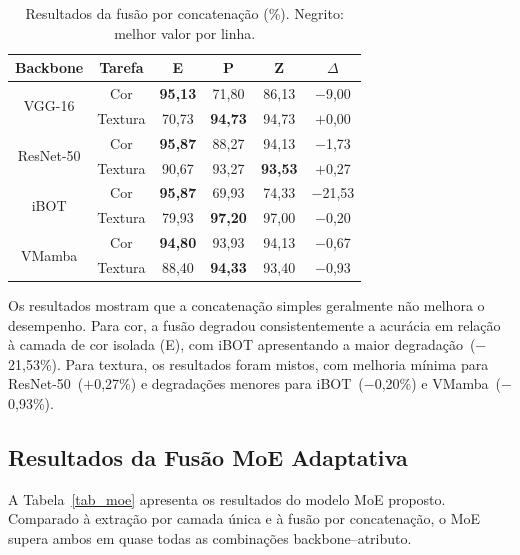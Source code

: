 \documentclass[conference]{IEEEtran}
\begin{document}
\begin{table}[htbp]
\caption{Resultados da fus\~{a}o por concatena\c{c}\~{a}o (\%). Negrito:
         melhor valor por linha.}
\begin{center}
\begin{tabular}{c|c|c|c|c|c}
\hline
\textbf{Backbone} & \textbf{Tarefa} & \textbf{E} & \textbf{P}
                  & \textbf{Z} & \textbf{$\Delta$} \\
\hline
\multirow{2}{*}{VGG-16}
  & Cor     & \textbf{95,13} & 71,80 & 86,13 & $-$9,00 \\
  & Textura & 70,73 & \textbf{94,73} & 94,73 & $+$0,00 \\
\hline
\multirow{2}{*}{ResNet-50}
  & Cor     & \textbf{95,87} & 88,27 & 94,13 & $-$1,73 \\
  & Textura & 90,67 & 93,27 & \textbf{93,53} & $+$0,27 \\
\hline
\multirow{2}{*}{iBOT}
  & Cor     & \textbf{95,87} & 69,93 & 74,33 & $-$21,53 \\
  & Textura & 79,93 & \textbf{97,20} & 97,00 & $-$0,20 \\
\hline
\multirow{2}{*}{VMamba}
  & Cor     & \textbf{94,80} & 93,93 & 94,13 & $-$0,67 \\
  & Textura & 88,40 & \textbf{94,33} & 93,40 & $-$0,93 \\
\hline
\end{tabular}
\label{tab_concat}
\end{center}
\end{table}

Os resultados mostram que a concatena\c{c}\~{a}o simples geralmente n\~{a}o
melhora o desempenho.
Para cor, a fus\~{a}o degradou consistentemente a acur\'{a}cia em rela\c{c}\~{a}o
\`{a} camada de cor isolada (E), com iBOT apresentando a maior
degrada\c{c}\~{a}o~($-$21,53\%).
Para textura, os resultados foram mistos, com melhoria m\'{i}nima para
ResNet-50~($+$0,27\%) e degrada\c{c}\~{o}es menores para iBOT~($-$0,20\%)
e VMamba~($-$0,93\%).

\subsection{Resultados da Fus\~{a}o MoE Adaptativa}

A Tabela~\ref{tab_moe} apresenta os resultados do modelo MoE proposto.
Comparado \`{a} extra\c{c}\~{a}o por camada \'{u}nica e \`{a} fus\~{a}o
por concatena\c{c}\~{a}o, o MoE supera ambos em quase todas as
combina\c{c}\~{o}es backbone--atributo.
\end{document}
